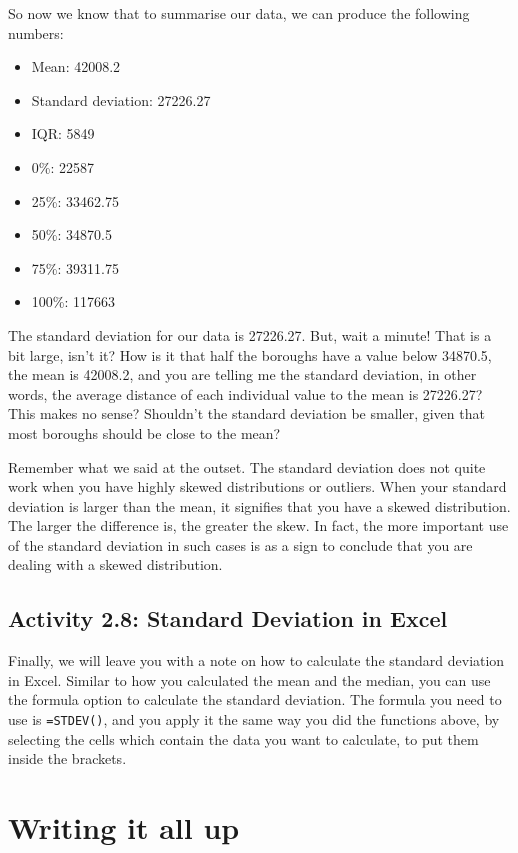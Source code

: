 \documentclass[
]{book}
\providecommand{\tightlist}{%
  \setlength{\itemsep}{0pt}\setlength{\parskip}{0pt}}
\begin{document}
So now we know that to summarise our data, we can produce the following numbers:

\begin{itemize}
\tightlist
\item
  Mean: 42008.2
\item
  Standard deviation: 27226.27
\item
  IQR: 5849
\item
  0\%: 22587
\item
  25\%: 33462.75
\item
  50\%: 34870.5
\item
  75\%: 39311.75
\item
  100\%: 117663
\end{itemize}

The standard deviation for our data is 27226.27. But, wait a minute! That is a bit large, isn't it? How is it that half the boroughs have a value below 34870.5, the mean is 42008.2, and you are telling me the standard deviation, in other words, the average distance of each individual value to the mean is 27226.27? This makes no sense? Shouldn't the standard deviation be smaller, given that most boroughs should be close to the mean?

Remember what we said at the outset. The standard deviation does not quite work when you have highly skewed distributions or outliers. When your standard deviation is larger than the mean, it signifies that you have a skewed distribution. The larger the difference is, the greater the skew. In fact, the more important use of the standard deviation in such cases is as a sign to conclude that you are dealing with a skewed distribution.

\hypertarget{activity-2.8-standard-deviation-in-excel}{%
\subsection{Activity 2.8: Standard Deviation in Excel}\label{activity-2.8-standard-deviation-in-excel}}

Finally, we will leave you with a note on how to calculate the standard deviation in Excel. Similar to how you calculated the mean and the median, you can use the formula option to calculate the standard deviation. The formula you need to use is \texttt{=STDEV()}, and you apply it the same way you did the functions above, by selecting the cells which contain the data you want to calculate, to put them inside the brackets.

\hypertarget{writing-it-all-up}{%
\section{Writing it all up}\label{writing-it-all-up}}
\end{document}
